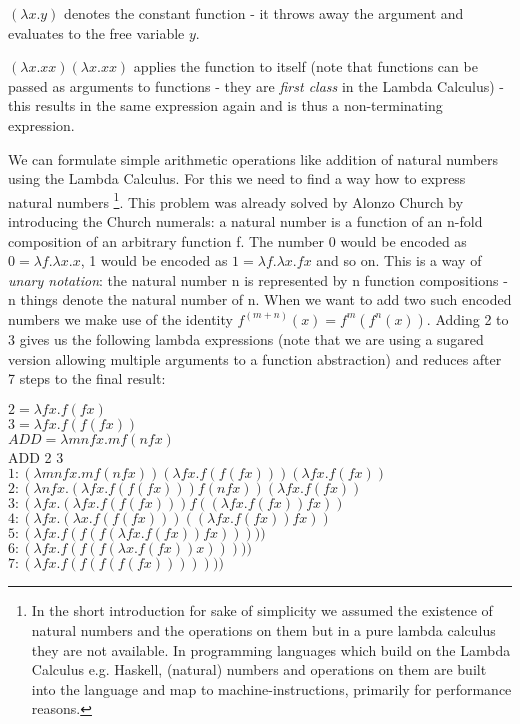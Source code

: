 $(\lambda x.y)$ denotes the constant function - it throws away the argument and evaluates to the free variable $y$. 

\medskip

$(\lambda x.xx)(\lambda x.xx)$ applies the function to itself (note that functions can be passed as arguments to functions - they are \textit{first class} in the Lambda Calculus) - this results in the same expression again and is thus a non-terminating expression.

\medskip

We can formulate simple arithmetic operations like addition of natural numbers using the Lambda Calculus. For this we need to find a way how to express natural numbers \footnote{In the short introduction for sake of simplicity we assumed the existence of natural numbers and the operations on them but in a pure lambda calculus they are not available. In programming languages which build on the Lambda Calculus e.g. Haskell, (natural) numbers and operations on them are built into the language and map to machine-instructions, primarily for performance reasons.}. This problem was already solved by Alonzo Church by introducing the Church numerals: a natural number is a function of an n-fold composition of an arbitrary function f. The number 0 would be encoded as $0 = \lambda f . \lambda x.x$, 1 would be encoded as $1 = \lambda f . \lambda x . f x$ and so on. This is a way of \textit{unary notation}: the natural number n is represented by n function compositions - n things denote the natural number of n.
When we want to add two such encoded numbers we make use of the identity $f^{(m+n)}(x) = f^m(f^n(x))$. Adding 2 to 3 gives us the following lambda expressions (note that we are using a sugared version allowing multiple arguments to a function abstraction) and reduces after 7 steps to the final result:

\medskip

$2 = \lambda f x . f(f x)$ \\
$3 = \lambda f x . f(f(f x))$ \\
$ADD = \lambda m n f x . m f (n f x)$ \\

ADD 2 3 \\
$1: (\lambda m n f x. m f (n f x)) (\lambda f x.f(f(f x))) (\lambda f x.f(f x))$ \\
$2:  (\lambda n f x. (\lambda f x.f(f(f x))) f (n f x))   (\lambda f x.f(f x))$ \\
$3:     (\lambda f x. (\lambda f x.f(f(f x))) f ((\lambda f x.f(f x)) f x)) $ \\ 
$4:     (\lambda f x.   (\lambda x.f(f(f x)))   ((\lambda f x.f(f x)) f x)) $ \\
$5:     (\lambda f x.       f(f(f(\lambda f x.f(f x)) f x)))))$ \\
$6:     (\lambda f x.       f(f(f  (\lambda x.f(f x)) x)))))$ \\
$7:     (\lambda f x.       f(f(f     (f(f x))  )))))$

